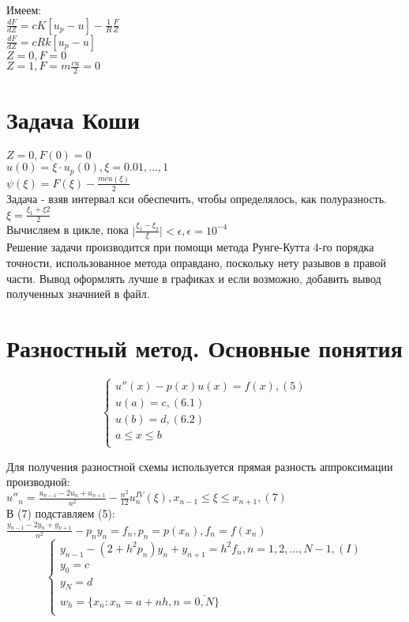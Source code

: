 Имеем:\\
$\frac{dF}{dZ} = cK[u_{p} - u] - \frac{1}{R} \frac{F}{Z}$\\
$\frac{dF}{dZ} = c R k[u_{p} - u]$\\
$Z = 0, F = 0$\\
$Z = 1, F = m\frac{cu}{2} = 0$\\

\section{Задача Коши}
$Z = 0, F(0) = 0$\\
$u(0) = \xi \cdot u_{p}(0), \xi = 0.01, ..., 1$\\
$\psi(\xi) = F(\xi) - \frac{m c u(\xi)}{2}$\\

Задача - взяв интервал кси обеспечить, чтобы определялось, как полуразность. $\xi = \frac{\xi_{1} + \xi{2}}{2}$\\
Вычисляем в цикле, пока $\bigg|\frac{\xi_{1} - \xi_{2}}{\xi}\bigg| < \epsilon, \epsilon = 10^{-4}$\\

Решение задачи производится при помощи метода Рунге-Кутта 4-го порядка точности, использованное метода оправдано, поскольку нету разывов в правой части. Вывод оформлять лучше в графиках и если возможно, добавить вывод полученных значнией в файл.

\section{Разностный метод. Основные понятия}
\begin{equation}
\begin{cases}
u''(x) - p(x) u(x) = f(x), (5)\\
u(a) = c, (6.1)\\
u(b) = d, (6.2)\\
a \leqslant x \leqslant b\\
\end{cases}
\end{equation}

Для получения разностной схемы используется прямая разность аппроксимации производной:\\
$u''_{n} = \frac{u_{n-1} - 2u_{n} + u_{n+1}}{n^{2}} - \frac{n^{2}}{12}u_{n}^{IV}(\xi), x_{n-1} \leqslant \xi \leqslant x_{n+1}, (7)$\\
В (7) подставляем (5):\\
$\frac{y_{n-1} - 2y_{n} + y_{n+1}}{n^{2}} - p_{n}y_{n} = f_{n}, p_{n} = p(x_{n}), f_{n} = f(x_{n})$\\
\begin{equation}
\begin{cases}
y_{n-1} - (2 + h^{2} p_{n})y_{n} + y_{n+1} = h^{2} f_{n}, n = 1,2, ..., N-1, (I)\\
y_{0} = c\\
y_{N} = d\\
w_{h} = \{x_{n}: x_{n} = a + nh, n = \overline{0, N}\}\\
\end{cases}
\end{equation}

